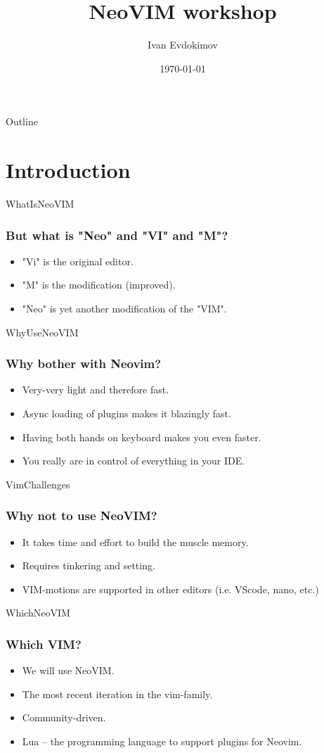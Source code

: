 \documentclass{beamer}
\title{NeoVIM workshop}
\author{Ivan Evdokimov}
\date{\today}
\begin{document}
\begin{frame}
    \titlepage
\end{frame}

\begin{frame}{Outline}
    \tableofcontents
\end{frame}

\section{Introduction}
\begin{frame}{WhatIsNeoVIM}
    \frametitle{But what is "Neo" and "VI" and "M"?}
    \begin{itemize}
        \item "Vi" is the original editor.
        \item "M" is the modification (improved).
        \item "Neo" is yet another modification of the "VIM".
    \end{itemize}
\end{frame}

\begin{frame}{WhyUseNeoVIM}
    \frametitle{Why bother with Neovim?}
    \begin{itemize}
        \item Very-very light and therefore fast.
        \item Async loading of plugins makes it blazingly fast.
        \item Having both hands on keyboard makes you even faster.
        \item You really are in control of everything in your IDE.
    \end{itemize}
\end{frame}

\begin{frame}{VimChallenges}
    \frametitle{Why \textbf{not} to use NeoVIM?}
    \begin{itemize}
        \item It takes time and effort to build the muscle memory.
        \item Requires tinkering and setting.
        \item VIM-motions are supported in other editors (i.e. VScode, nano, etc.)
    \end{itemize}
\end{frame}

\begin{frame}{WhichNeoVIM}
    \frametitle{Which VIM?}
    \begin{itemize}
        \item We will use NeoVIM.
        \item The most recent iteration in the vim-family.
        \item Community-driven.
        \item \textsf{Lua} -- the programming language to support plugins for Neovim.
    \end{itemize}
\end{frame}
\end{document}

